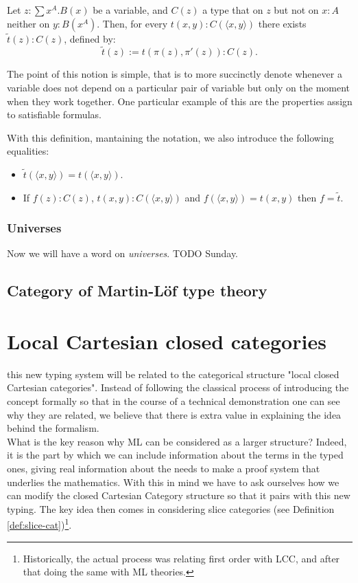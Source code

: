 \begin{definition}
  Let $z : \sum x^A.B(x)$ be a variable, and $C(z)$ a type that on $z$ but not on $x:A$ neither on $y:B(x^A)$. Then, for every $t(x,y) : C(\langle x, y\rangle)$ there exists $\tilde t (z) : C(z)$, defined by:
  $$\tilde t (z) := t(\pi(z),\pi'(z)): C(z).$$
\end{definition}

The point of this notion is simple, that is to more succinctly denote whenever a variable does not depend on a particular pair of variable but only on the moment when they work together. One particular example of this are the properties assign to satisfiable formulas.

With this definition, mantaining the notation, we also introduce the following equalities:
\begin{itemize}
\item $\tilde t(\langle x,y\rangle) = t(\langle x,y\rangle) $.
\item If $f(z): C(z)$, $t(x,y):C(\langle x,y\rangle)$ and $f(\langle x,y\rangle) = t(x,y)$ then $f=\tilde t$.

\end{itemize}


\subsubsection{Universes}
Now we will have a word on \emph{universes}. TODO Sunday.

\subsection{Category of Martin-Löf type theory}



\section{Local Cartesian closed categories}

this new typing system will be related to the categorical structure "local closed Cartesian categories". Instead of following the classical process of introducing the concept formally so that in the course of a technical demonstration one can see why they are related, we believe that there is extra value in explaining the idea behind the formalism.\\


What is the key reason why ML can be considered as a larger structure? Indeed, it is the part by which we can include information about the terms in the typed ones, giving real information about the needs to make a proof system that underlies the mathematics. With this in mind we have to ask ourselves how we can modify the closed Cartesian Category structure so that it pairs with this new typing.  The key idea then comes in considering slice categories (see Definition \ref{def:slice-cat})\footnote{Historically, the actual process was relating first order with LCC, and after that doing the same with ML theories.}.\\

